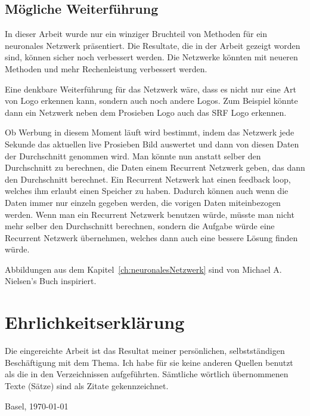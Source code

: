 \documentclass[12pt,a4paper]{report}
\begin{document}
\section{Mögliche Weiterführung}
In dieser Arbeit wurde nur ein winziger Bruchteil von Methoden für ein neuronales Netzwerk präsentiert.
Die Resultate, die in der Arbeit gezeigt worden sind, können sicher noch verbessert werden.
Die Netzwerke könnten mit neueren Methoden und mehr Rechenleistung verbessert werden.

Eine denkbare Weiterführung für das Netzwerk wäre, dass es nicht nur eine Art von Logo erkennen kann, sondern auch noch andere Logos.
Zum Beispiel könnte dann ein Netzwerk neben dem Prosieben Logo auch das SRF Logo erkennen.

Ob Werbung in diesem Moment läuft wird bestimmt,
indem das Netzwerk jede Sekunde das aktuellen live Prosieben Bild auswertet und dann von diesen Daten der Durchschnitt genommen wird.
Man könnte nun anstatt selber den Durchschnitt zu berechnen, die Daten einem Recurrent Netzwerk geben, das dann den Durchschnitt berechnet.
Ein Recurrent Netzwerk hat einen feedback loop, welches ihm erlaubt einen Speicher zu haben\cite{wiki:rnn}.
Dadurch können auch wenn die Daten immer nur einzeln gegeben werden, die vorigen Daten miteinbezogen werden.
Wenn man ein Recurrent Netzwerk benutzen würde, müsste man nicht mehr selber den Durchschnitt berechnen,
sondern die Aufgabe würde eine Recurrent Netzwerk übernehmen, welches dann auch eine bessere Lösung finden würde.


\clearpage
{}
{}



\clearpage
{}
{}
\listoffigures
Abbildungen aus dem Kapitel~\ref{ch:neuronalesNetzwerk} sind von Michael A. Nielsen's Buch\cite{neuralbook} inspiriert.

\appendix


\chapter*{Ehrlichkeitserklärung}

Die eingereichte Arbeit ist das Resultat meiner persönlichen, selbstständigen Beschäftigung mit dem Thema.
Ich habe für sie keine anderen Quellen benutzt als die in den Verzeichnissen aufgeführten.
Sämtliche wörtlich übernommenen Texte (Sätze) sind als Zitate gekennzeichnet.

\vspace{2cm}
Basel, \today
\end{document}
